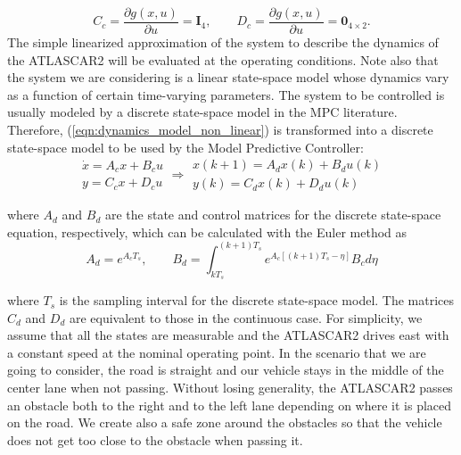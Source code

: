 \documentclass[conference,11pt]{IEEEtran}
\renewcommand{\vec}[1]{\ensuremath{\boldsymbol{\mathit{#1}}}}
\begin{document}
\[
\vec{C}_c=\frac{\partial \vec{g}(\vec{x},\vec{u})}{\partial \vec{u}} = \mathbf{I}_4, 
\qquad
\vec{D}_c=\frac{\partial \vec{g}(\vec{x},\vec{u})}{\partial \vec{u}}=\mathbf{0}_{4\times2}. 
\]
The simple linearized approximation of the system to describe the dynamics of the ATLASCAR2 will be evaluated at the operating conditions. Note also that the system we are considering is a linear state-space model whose dynamics vary as a function of certain time-varying parameters. The system to be controlled is usually modeled by a discrete state-space model in the MPC literature. Therefore, (\ref{eqn:dynamics_model_non_linear})
is transformed into a discrete state-space model to be used by the Model Predictive Controller:
\begin{equation*}
\label{eqn:dynamics_ss_obstacle_avoidance_dis}
	\begin{array}{ll}
	\dot{\vec{x}} =\vec{A}_c \vec{x}+ \vec{B}_c \vec{u}\\
	\vec{y} =\vec{C}_c \vec{x} + \vec{D}_c \vec{u}
	\end{array}
	\Rightarrow
	\begin{array}{rr}
	{\vec{x}}(k+1) =\vec{A}_d \vec{x}(k)+ \vec{B}_d \vec{u}(k)\\
	\vec{y}(k) =\vec{C}_d \vec{x}(k) + \vec{D}_d \vec{u}(k)
	\end{array}
\end{equation*}

where $\vec{A}_d$ and $\vec{B}_d$ are the state and control matrices for the discrete state-space equation, respectively, which can be calculated with the Euler method as
\begin{equation*}
\vec{A}_d = e^{\vec{A}_cT_s},\qquad \vec{B}_d = \int_{kT_s}^{(k+1)T_s} e^{\vec{A}_c[(k+1)T_s-\eta]}\vec{B}_c d\eta
\end{equation*}

where $T_s$ is the sampling interval for the discrete state-space model. The matrices $\vec{C}_d$ and $\vec{D}_d$ are equivalent to those in the continuous case. For simplicity, we assume that all the states are measurable and the ATLASCAR2 drives east with a constant speed at the nominal operating point. In the scenario that we are going to consider, the road is straight and our vehicle stays in the middle of the center lane when not passing. Without losing generality, the ATLASCAR2 passes an obstacle both to the right and to the left lane depending on where it is placed on the road. We create also a safe zone around the obstacles so that the vehicle does not get too close to the obstacle when passing it.
\end{document}
